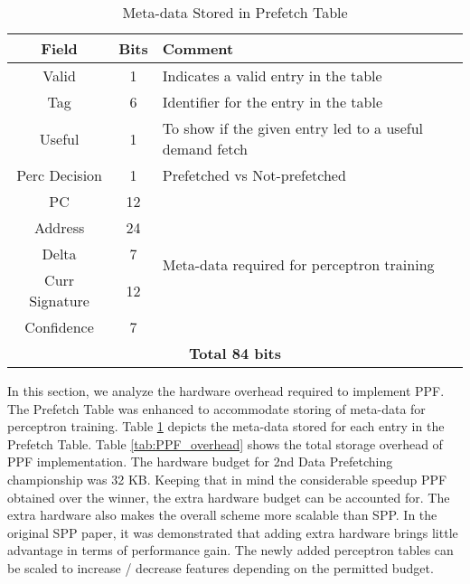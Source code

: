 \begin{table}[t]
    \centering
    \begin{tabular}{|c|c|m{4.8cm}|}
    \hline
        \textbf{Field} &
        \textbf{Bits} &
        \textbf{Comment} \\
    \hline
         Valid & 1 & Indicates a valid entry in the table\\
         Tag & 6 & Identifier for the entry in the table\\
         Useful & 1 & To show if the given entry led to a useful demand fetch\\
         Perc Decision & 1 & Prefetched vs Not-prefetched \\
    \hline
        PC & 12 & \multirow{5}{4.8cm}{Meta-data required for perceptron training}\\
        Address & 24 & \\
        Delta & 7 & \\
        Curr Signature & 12 & \\
        Confidence & 7 & \\
    \hline
        \multicolumn{3}{|c|}{\textbf{Total 84 bits}}\\
    \hline
    \end{tabular}
    \caption{Meta-data Stored in Prefetch Table}
    \label{tab:PTable_metadata}
\end{table}

In this section, we analyze the hardware overhead required to
implement PPF.  The Prefetch Table was enhanced to accommodate
storing of meta-data for perceptron training.  Table
\ref{tab:PTable_metadata} depicts the meta-data stored for each entry in
the Prefetch Table.  Table \ref{tab:PPF_overhead} shows the total
storage overhead of PPF implementation.  The hardware budget for
2nd Data Prefetching championship was 32 KB.  Keeping that in mind 
the considerable speedup PPF obtained over the winner, the extra hardware
budget can be accounted for.  The extra hardware also makes the
overall scheme more scalable than SPP.  In the original SPP paper, it
was demonstrated that adding extra hardware brings little advantage in
terms of performance gain.  The newly added perceptron tables can be
scaled to increase / decrease features depending on the permitted
budget.

